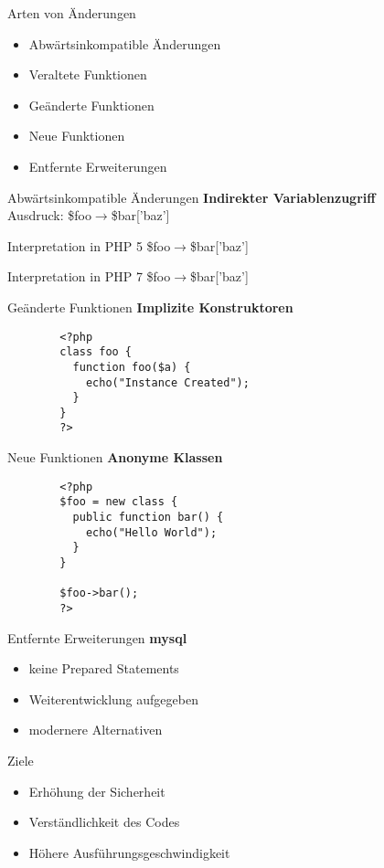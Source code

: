 \begin{frame} {Arten von Änderungen}
	\begin{itemize}
		\item Abwärtsinkompatible Änderungen
		\item Veraltete Funktionen
		\item Geänderte Funktionen
		\item Neue Funktionen
		\item Entfernte Erweiterungen
	\end{itemize}
	\end{frame}

	\begin{frame} {Abwärtsinkompatible Änderungen}
		\textbf{Indirekter Variablenzugriff} \nocite{php_group_php:_nodate-1} \\
		Ausdruck: \$foo$\rightarrow$\$bar['baz']
		\begin{exampleblock}{Interpretation in PHP 5}
			\$foo$\rightarrow$\alert{\$bar['baz']}
		\end{exampleblock}{}
		\begin{exampleblock}{Interpretation in PHP 7}
			\alert{\$foo$\rightarrow$\$bar}['baz']
		\end{exampleblock}{}
	\end{frame}

	\begin{frame}[fragile]{Geänderte Funktionen}
        \textbf{Implizite Konstruktoren} \nocite{morrison_php:_2014}\\
        \begin{lstlisting}
        <?php
        class foo {
          function foo($a) {
            echo("Instance Created");
          }
        }
        ?>
        \end{lstlisting}
    \end{frame}
    
    \begin{frame}[fragile]{Neue Funktionen}
        \textbf{Anonyme Klassen}\\
        \begin{lstlisting}
        <?php
        $foo = new class {
          public function bar() {
            echo("Hello World");
          }
        }

        $foo->bar();
        ?>
        \end{lstlisting}
    \end{frame}

    \begin{frame}[fragile]{Entfernte Erweiterungen}
        \textbf{mysql} \nocite{oracle_mysql_nodate}\\
        \begin{itemize}
            \item keine \alert{Prepared Statements}
            \item Weiterentwicklung aufgegeben
            \item modernere Alternativen
        \end{itemize}  
    \end{frame}

    \begin{frame}{Ziele}
        \begin{itemize}
            \item Erhöhung der Sicherheit
            \item Verständlichkeit des Codes
            \item Höhere Ausführungsgeschwindigkeit
        \end{itemize}  
    \end{frame}